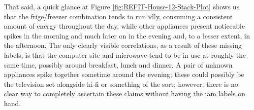 \begin{figure}[hbt!]
        \begin{adjustwidth*}{-3.0cm}{-3.0cm}%
                \myfloatalign
                 \quad
                 \quad
                \caption{}
                \label{fig:REFIT-Stack-IAM-Plot}
        \end{adjustwidth*}
\end{figure}

\noindent \newline That said, a quick glance at Figure \ref{fig:REFIT-House-12-Stack-Plot} shows us that the frige/freezer combination tends to run idly, consuming a consistent amount of energy throughout the day, while other appliances present noticeable spikes in the morning and much later on in the evening and, to a lesser extent, in the afternoon. The only clearly visible correlations, as a result of these missing labels, is that the computer site and microwave tend to be in use at roughly the same time, possibly around breakfast, lunch and dinner. A pair of unknown appliances spike together sometime around the evening; these could possibly be the television set alongside hi-fi or something of the sort; however, there is no clear way to completely ascertain these claims without having the \gls{iam} labels on hand.

